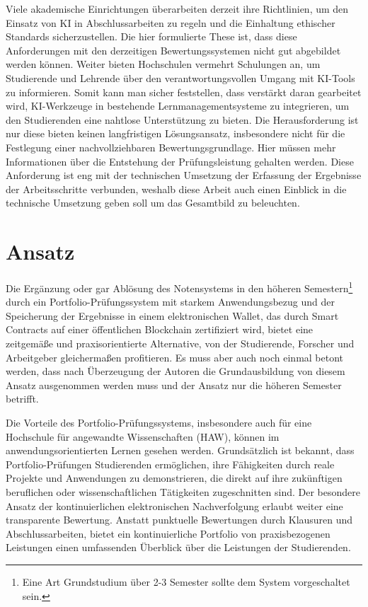 \documentclass[conference]{IEEEtran}
\begin{document}
Viele akademische Einrichtungen überarbeiten derzeit ihre \cite{mrass2023chatgpt} Richtlinien, um den Einsatz von KI in Abschlussarbeiten zu regeln und die Einhaltung ethischer Standards sicherzustellen. Die hier formulierte These ist, dass diese Anforderungen mit den derzeitigen Bewertungssystemen nicht gut abgebildet werden können. Weiter bieten Hochschulen vermehrt Schulungen an, um Studierende und Lehrende über den verantwortungsvollen Umgang mit KI-Tools zu informieren. Somit kann man sicher feststellen, dass verstärkt daran gearbeitet wird, KI-Werkzeuge in bestehende Lernmanagementsysteme zu integrieren, um den Studierenden eine nahtlose Unterstützung zu bieten. Die Herausforderung ist nur diese bieten keinen langfristigen Lösungsansatz, insbesondere nicht für die Festlegung einer nachvollziehbaren Bewertungsgrundlage. Hier müssen mehr Informationen über die Entstehung der Prüfungsleistung gehalten werden.
Diese Anforderung ist eng mit der technischen Umsetzung der Erfassung der Ergebnisse der Arbeitsschritte verbunden, weshalb diese Arbeit auch einen Einblick in die technische Umsetzung geben soll um das Gesamtbild zu beleuchten. 

\section{Ansatz}

Die Ergänzung oder gar Ablösung des Notensystems in den höheren Semestern\footnote{Eine Art Grundstudium über 2-3 Semester sollte dem System vorgeschaltet sein.} durch ein Portfolio-Prüfungssystem mit starkem Anwendungsbezug und der Speicherung der Ergebnisse in einem elektronischen Wallet, das durch Smart Contracts auf einer öffentlichen Blockchain zertifiziert wird, bietet eine zeitgemäße und praxisorientierte Alternative, von der Studierende, Forscher und Arbeitgeber gleichermaßen profitieren. Es muss aber auch noch einmal betont werden, dass nach Überzeugung der Autoren die Grundausbildung von diesem Ansatz ausgenommen werden muss und der Ansatz nur die höheren Semester betrifft. 

Die Vorteile des Portfolio-Prüfungssystems, insbesondere auch für eine Hochschule für angewandte Wissenschaften (HAW), können im anwendungsorientierten Lernen gesehen werden. Grundsätzlich ist bekannt, dass Portfolio-Prüfungen Studierenden ermöglichen, ihre Fähigkeiten durch reale Projekte und Anwendungen zu demonstrieren, die direkt auf ihre zukünftigen beruflichen oder wissenschaftlichen Tätigkeiten zugeschnitten sind. Der besondere Ansatz der kontinuierlichen elektronischen Nachverfolgung erlaubt weiter eine transparente Bewertung. Anstatt punktuelle Bewertungen durch Klausuren und Abschlussarbeiten, bietet ein kontinuierliche Portfolio von praxisbezogenen Leistungen einen umfassenden Überblick über die Leistungen der Studierenden.
\end{document}
